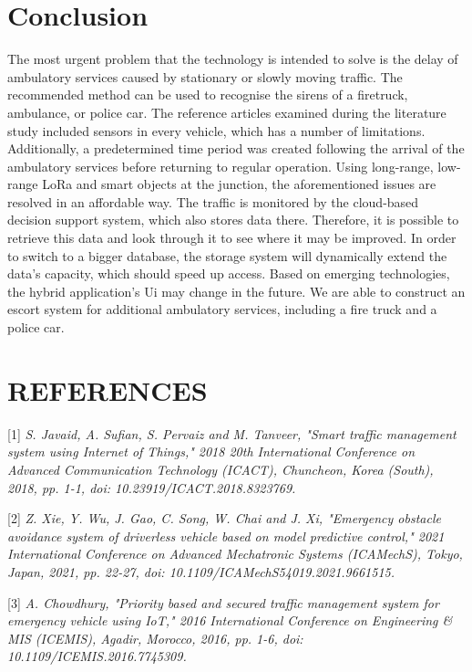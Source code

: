 \documentclass[conference]{IEEEtran}
\begin{document}

\section{Conclusion}
The most urgent problem that the technology is intended to solve is the delay of ambulatory services caused by stationary or slowly moving traffic. The recommended method can be used to recognise the sirens of a firetruck, ambulance, or police car. The reference articles examined during the literature study included sensors in every vehicle, which has a number of limitations. Additionally, a predetermined time period was created following the arrival of the ambulatory services before returning to regular operation. Using long-range, low-range LoRa and smart objects at the junction, the aforementioned issues are resolved in an affordable way. The traffic is monitored by the cloud-based decision support system, which also stores data there. Therefore, it is possible to retrieve this data and look through it to see where it may be improved. In order to switch to a bigger database, the storage system will dynamically extend the data's capacity, which should speed up access. Based on emerging technologies, the hybrid application's Ui may change in the future. We are able to construct an escort system for additional ambulatory services, including a fire truck and a police car.

\section{REFERENCES}



[1]\emph{ S. Javaid, A. Sufian, S. Pervaiz and M. Tanveer, "Smart traffic management system using Internet of Things," 2018 20th International Conference on Advanced Communication Technology (ICACT), Chuncheon, Korea (South), 2018, pp. 1-1, doi: 10.23919/ICACT.2018.8323769. }

[2]\emph{ Z. Xie, Y. Wu, J. Gao, C. Song, W. Chai and J. Xi, "Emergency obstacle avoidance system of driverless vehicle based on model predictive control," 2021 International Conference on Advanced Mechatronic Systems (ICAMechS), Tokyo, Japan, 2021, pp. 22-27, doi: 10.1109/ICAMechS54019.2021.9661515. }

[3]\emph{ A. Chowdhury, "Priority based and secured traffic management system for emergency vehicle using IoT," 2016 International Conference on Engineering & MIS (ICEMIS), Agadir, Morocco, 2016, pp. 1-6, doi: 10.1109/ICEMIS.2016.7745309.}
\end{document}
